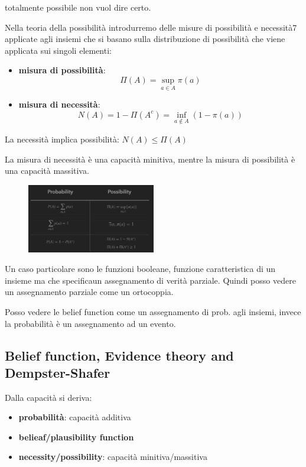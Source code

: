 \begin{nota}
    totalmente possibile non vuol dire certo.
\end{nota}

Nella teoria della possibilità introdurremo delle misure di possibilità e necessità7
applicate agli insiemi che si basano sulla distribuzione di possibilità che viene 
applicata sui singoli elementi:
\begin{itemize}
    \item \textbf{misura di possibilità}: 
    $$\Pi(A) = \sup_{a\in A}\pi(a)$$
    \item \textbf{misura di necessità}: 
    $$N(A) = 1- \Pi(A^c) =\inf_{a\not\in A}(1-\pi(a))$$
\end{itemize}

\begin{nota}
    La necessità implica possibilità: $N(A) \le \Pi(A)$
\end{nota}
\begin{nota}
    La misura di necessità è una capacità minitiva, mentre la misura di possibilità è
    una capacità massitiva.
\end{nota}

\begin{figure}[!h]
    \centering
    \includegraphics[width=0.5\textwidth]{img/sistemi_incerti/diff_prob_poss.png}
\end{figure}

Un caso particolare sono le funzioni booleane, funzione caratteristica di un insieme
ma che specificaun assegnamento di verità parziale. Quindi posso vedere un assegnamento 
parziale come un ortocoppia.

Posso vedere le belief function come un assegnamento di prob. agli insiemi, invece 
la probabilità è un assegnamento ad un evento.
\subsection{Belief function, Evidence theory and Dempster-Shafer}
Dalla capacità si deriva:
\begin{itemize}
    \item \textbf{probabilità}: capacità additiva
    \item \textbf{belieaf/plausibility function}
    \item \textbf{necessity/possibility}: capacità minitiva/massitiva
\end{itemize}

